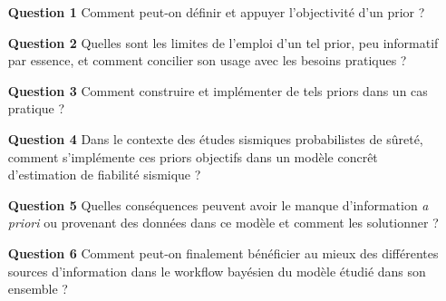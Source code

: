 

\begin{itemize}
    \item[\textbf{Question 1}] Comment peut-on définir et appuyer l'objectivité d'un prior ?
    \item[\textbf{Question 2}] Quelles sont les limites de l'emploi d'un tel prior, peu informatif par essence, et comment concilier son usage avec les besoins pratiques ?
    \item[\textbf{Question 3}] Comment construire et implémenter de tels priors dans un cas pratique ?
    \item[\textbf{Question 4}] Dans le contexte des études sismiques probabilistes de sûreté, comment s'implémente ces priors objectifs dans un modèle concrêt d'estimation de fiabilité sismique ?
    \item[\textbf{Question 5}] Quelles conséquences peuvent avoir le manque d'information \emph{a priori} ou provenant des données dans ce modèle et comment les solutionner ?
    \item[\textbf{Question 6}] Comment peut-on finalement bénéficier au mieux des différentes sources d'information dans le workflow bayésien du modèle étudié dans son ensemble ?
\end{itemize}
















